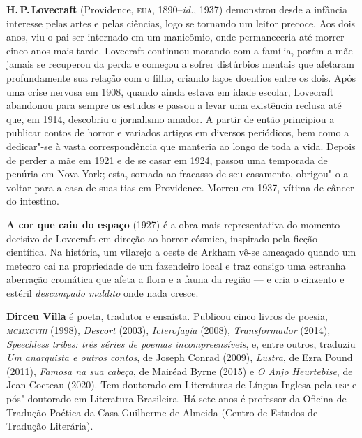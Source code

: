 \textbf{H.\,P.\,Lovecraft} (Providence, \textsc{eua}, 1890--\textit{id.}, 1937) demonstrou desde a infância interesse pelas artes e pelas ciências, logo se tornando um leitor precoce. Aos dois anos, viu o pai ser internado em um manicômio, onde permaneceria até morrer cinco anos mais tarde. Lovecraft continuou morando com a família, porém a mãe jamais se recuperou da perda e começou a sofrer distúrbios mentais que afetaram profundamente sua relação com o filho, criando laços doentios entre os dois. Após uma crise nervosa em 1908, quando ainda estava em idade escolar, Lovecraft abandonou para sempre os estudos e passou a levar uma existência reclusa até que, em 1914, descobriu o jornalismo amador. A partir de então principiou a publicar contos de horror e variados artigos em diversos periódicos, bem como a dedicar"-se à vasta correspondência que manteria ao longo de toda a vida. Depois de perder a mãe em 1921 e de se casar em 1924, passou uma temporada de penúria em Nova York; esta, somada ao fracasso de seu casamento, obrigou"-o a voltar para a casa de suas tias em Providence. Morreu em 1937, vítima de câncer do intestino.

\pagebreak
\thispagestyle{empty}

\textbf{A cor que caiu do espaço} (1927) é a obra mais representativa do momento decisivo de Lovecraft em direção ao horror cósmico, inspirado pela ficção científica. Na história, um vilarejo a oeste de Arkham vê-se ameaçado quando um meteoro cai na propriedade de um fazendeiro local e traz consigo uma estranha aberração cromática que afeta a flora e a fauna da região --- e cria o cinzento e estéril \textit{descampado maldito} onde nada cresce.

\textbf{Dirceu Villa} é poeta, tradutor e ensaísta. Publicou cinco livros de poesia, \textit{\textsc{mcmxcviii}} (1998), \textit{Descort} (2003), \textit{Icterofagia} (2008), \textit{Transformador} (2014), \textit{Speechless tribes: três séries de poemas incompreensíveis}, e, entre outros, traduziu \textit{Um anarquista e outros contos}, de Joseph Conrad (2009), \textit{Lustra}, de Ezra Pound (2011), \textit{Famosa na sua cabeça}, de Mairéad Byrne (2015) e \textit{O Anjo Heurtebise}, de Jean Cocteau (2020). Tem doutorado em Literaturas de Língua Inglesa pela \textsc{usp} e pós"-doutorado em Literatura Brasileira. Há sete anos é professor da Oficina de Tradução Poética da Casa Guilherme de Almeida (Centro de Estudos de Tradução Literária).

\blankpage



